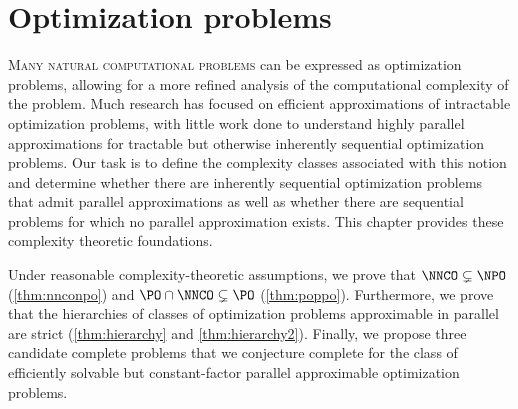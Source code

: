 \newcommand{\cl}{\operatorname{cl}}

\chapter{Optimization problems}
\label{chp:optimization}

%
%
%
\lettrine{M}{any natural computational problems} can be expressed as optimization problems, allowing for a more refined analysis of the computational complexity of the problem.
%
%
%
Much research has focused on efficient approximations of intractable optimization problems, with little work done to understand highly parallel approximations for tractable but otherwise inherently sequential optimization problems.
%
%
%
Our task is to define the complexity classes associated with this notion and determine whether there are inherently sequential optimization problems that admit parallel approximations as well as whether there are sequential problems for which no parallel approximation exists.
%
%
%
This chapter provides these complexity theoretic foundations.

%
%
%
%
Under reasonable complexity-theoretic assumptions, we prove that $\NNCO \subsetneq \NPO$ (\autoref{thm:nnconpo}) and $\PO \cap \NNCO \subsetneq \PO$ (\autoref{thm:poppo}).
Furthermore, we prove that the hierarchies of classes of optimization problems approximable in parallel are strict (\autoref{thm:hierarchy} and \autoref{thm:hierarchy2}).
Finally, we propose three candidate complete problems that we conjecture complete for the class of efficiently solvable but constant-factor parallel approximable optimization problems.

